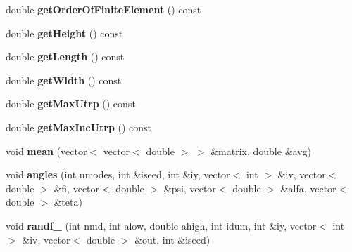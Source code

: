 \begin{DoxyCompactItemize}
\item 
\hypertarget{classnatrium_1_1TurbulentChannelFlow3D_af4006f6ab6aa2a50b68f12ca2914c467}{
double {\bfseries getOrderOfFiniteElement} () const }
\label{classnatrium_1_1TurbulentChannelFlow3D_af4006f6ab6aa2a50b68f12ca2914c467}

\item 
\hypertarget{classnatrium_1_1TurbulentChannelFlow3D_a4f9b365a4c4d0c38822be3b77c4a818d}{
double {\bfseries getHeight} () const }
\label{classnatrium_1_1TurbulentChannelFlow3D_a4f9b365a4c4d0c38822be3b77c4a818d}

\item 
\hypertarget{classnatrium_1_1TurbulentChannelFlow3D_a9b54eda9afcf408f8623d47315722291}{
double {\bfseries getLength} () const }
\label{classnatrium_1_1TurbulentChannelFlow3D_a9b54eda9afcf408f8623d47315722291}

\item 
\hypertarget{classnatrium_1_1TurbulentChannelFlow3D_a00bc5208b0b263f933b15169fffa5c69}{
double {\bfseries getWidth} () const }
\label{classnatrium_1_1TurbulentChannelFlow3D_a00bc5208b0b263f933b15169fffa5c69}

\item 
\hypertarget{classnatrium_1_1TurbulentChannelFlow3D_a3a8f288733304a89a5dd6deb08a9db44}{
double {\bfseries getMaxUtrp} () const }
\label{classnatrium_1_1TurbulentChannelFlow3D_a3a8f288733304a89a5dd6deb08a9db44}

\item 
\hypertarget{classnatrium_1_1TurbulentChannelFlow3D_aeb8c57df7519e022505d46164f53f9d0}{
double {\bfseries getMaxIncUtrp} () const }
\label{classnatrium_1_1TurbulentChannelFlow3D_aeb8c57df7519e022505d46164f53f9d0}

\item 
\hypertarget{classnatrium_1_1TurbulentChannelFlow3D_a1e3e23496273ae5495ad29af22e1facc}{
void {\bfseries mean} (vector$<$ vector$<$ double $>$ $>$ \&matrix, double \&avg)}
\label{classnatrium_1_1TurbulentChannelFlow3D_a1e3e23496273ae5495ad29af22e1facc}

\item 
\hypertarget{classnatrium_1_1TurbulentChannelFlow3D_ae0449fc4860ea522f9de86d92db8c5b1}{
void {\bfseries angles} (int nmodes, int \&iseed, int \&iy, vector$<$ int $>$ \&iv, vector$<$ double $>$ \&fi, vector$<$ double $>$ \&psi, vector$<$ double $>$ \&alfa, vector$<$ double $>$ \&teta)}
\label{classnatrium_1_1TurbulentChannelFlow3D_ae0449fc4860ea522f9de86d92db8c5b1}

\item 
\hypertarget{classnatrium_1_1TurbulentChannelFlow3D_ab59092223adefa914cf248c6ca65c85b}{
void {\bfseries randf\_} (int nmd, int alow, double ahigh, int idum, int \&iy, vector$<$ int $>$ \&iv, vector$<$ double $>$ \&out, int \&iseed)}
\label{classnatrium_1_1TurbulentChannelFlow3D_ab59092223adefa914cf248c6ca65c85b}


\end{DoxyCompactItemize}
